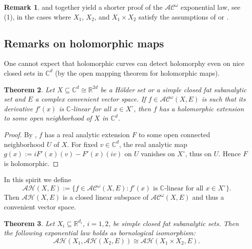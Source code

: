 \documentclass[10pt, reqno]{amsart}
\theoremstyle{plain}
\newtheorem{theorem}{Theorem}[section]
\theoremstyle{definition}
\newtheorem{remark}[theorem]{Remark}
\numberwithin{equation}{section}
\def\C{\mathbb{C}}
\def\R{\mathbb{R}}
\renewcommand{\o}{\circ}
\def\AA{\mathcal{AC}^\omega}
\begin{document}
\begin{remark}
     and  together yield a shorter proof of the $\AA$ exponential law, see (1), 
    in the cases where $X_1$, $X_2$, and $X_1 \times X_2$ satisfy the assumptions of  or .
\end{remark}


\subsection{Remarks on holomorphic maps} \label{ssec:hol}

One cannot expect that holomorphic curves can detect holomorphy even on nice closed sets in $\C^d$ 
(by the open mapping theorem for holomorphic maps).

\begin{theorem}
    Let $X \subseteq \C^d \cong \R^{2d}$ be a H\"older set or a simple closed fat subanalytic set 
    and $E$ a complex convenient vector space. 
    If $f \in \AA(X,E)$ is such that its derivative $f'(x)$ is $\C$-linear for all $x \in X^\o$, then $f$ has a holomorphic extension to some 
    open neighborhood of $X$ in $\C^d$.
\end{theorem}

\begin{proof}
    By , $f$ has a real analytic extension $F$ to some open connected neighborhood $U$ of $X$.  
    For fixed $v \in \C^d$, the real analytic map $g(x) := i F'(x)(v)-F'(x)(iv)$ on $U$ vanishes on $X^\o$, thus on $U$.
    Hence $F$ is holomorphic.
\end{proof}

In this spirit we define 
\[
    \mathcal{AH}(X,E) := \{ f \in \AA(X,E) : f'(x) \text{ is $\C$-linear for all } x \in X^\o\}.  
\]
Then $\mathcal{AH}(X,E)$ is a closed linear subspace of $\AA(X,E)$ and thus a convenient vector space. 

\begin{theorem}
    Let $X_i \subseteq \R^{d_i}$, $i=1,2$, be simple closed fat subanalytic sets. 
    Then the following exponential law holds as bornological isomorphism:
    \[
        \mathcal{AH}(X_1,\mathcal{AH}(X_2,E)) \cong \mathcal{AH}(X_1 \times X_2,E).
    \]
\end{theorem}
\end{document}
